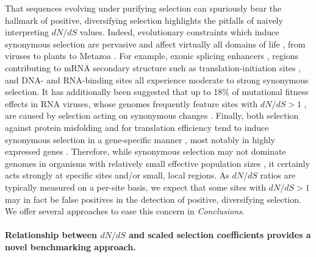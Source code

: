 \documentclass{pnastwo}
\begin{document}
\begin{article}
That sequences evolving under purifying selection can spuriously bear the hallmark of positive, diversifying selection highlights the pitfalls of naively interpreting $dN/dS$ values. Indeed, evolutionary constraints which induce synonymous selection are pervasive and affect virtually all domains of life \cite{GuZhouWilke2010}, from viruses \cite{Cuevasetal2011,ZaniniNeher2013} to plants \cite{Guetal2012} to Metazoa \cite{Duret2002,Chamaryetal2006,HershbergPetrov2008,PlotkinKudla2010,Lawrieetal2013}. 
For example, exonic splicing enhancers \cite{Schattner2006,Parmleyetal2006,ParmleyHurst2007}, regions contributing to mRNA secondary structure such as translation-initiation sites \cite{Chamaryetal2005,Schattner2006,GuZhouWilke2010,Cuevasetal2011,ZaniniNeher2013}, and DNA- and RNA-binding sites \cite{Parmleyetal2006} all experience moderate to strong synonymous selection. It has additionally been suggested that up to 18\% of mutational fitness effects in RNA viruses, whose genomes frequently feature sites with $dN/dS > 1$ \cite{Bushetal1999,Suzuki2006,Bhattetal2011,Meyeretal2013,MeyerWilke2013}, are caused by selection acting on synonymous changes \cite{Cuevasetal2011}. Finally, both selection against protein misfolding and for translation efficiency tend to induce synonymous selection in a gene-specific manner \cite{WillifordDemuth2012,Agasheetal2013}, most notably in highly expressed genes \cite{DrummondWilke2008,Lawrieetal2013}. Therefore, while synonymous selection may not dominate genomes in organisms with relatively small effective population sizes \cite{Chamaryetal2006, PlotkinKudla2010}, it certainly acts strongly at specific sites and/or small, local regions. As $dN/dS$ ratios are typically measured on a per-site basis, we expect that some sites with $dN/dS > 1$ may in fact be false positives in the detection of positive, diversifying selection. We offer several approaches to ease this concern in \emph{Conclusions}.



\paragraph{Relationship between $dN/dS$ and scaled selection coefficients provides a novel benchmarking approach.}


\end{article}
\end{document}
